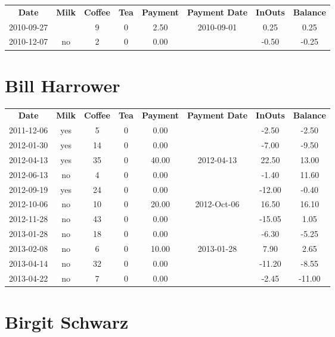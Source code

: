 \begin{center}
\begin{tabular}{cccccccc}
\textbf{Date} & \textbf{Milk} & \textbf{Coffee} & \textbf{Tea} & \textbf{Payment} & \textbf{Payment Date} & \textbf{InOuts} & \textbf{Balance} \\
2010-09-27 &  & 9 & 0 & 2.50 & 2010-09-01 &  0.25 &  0.25\\ 
2010-12-07 & no & 2 & 0 & 0.00 &  & -0.50 & -0.25
\end{tabular}
\end{center}

\section{Bill Harrower}

\begin{center}
\begin{tabular}{cccccccc}
\textbf{Date} & \textbf{Milk} & \textbf{Coffee} & \textbf{Tea} & \textbf{Payment} & \textbf{Payment Date} & \textbf{InOuts} & \textbf{Balance} \\
2011-12-06 & yes &  5 & 0 &  0.00 &  &  -2.50 &  -2.50\\ 
2012-01-30 & yes & 14 & 0 &  0.00 &  &  -7.00 &  -9.50\\ 
2012-04-13 & yes & 35 & 0 & 40.00 & 2012-04-13 &  22.50 &  13.00\\ 
2012-06-13 & no &  4 & 0 &  0.00 &  &  -1.40 &  11.60\\ 
2012-09-19 & yes & 24 & 0 &  0.00 &  & -12.00 &  -0.40\\ 
2012-10-06 & no & 10 & 0 & 20.00 & 2012-Oct-06 &  16.50 &  16.10\\ 
2012-11-28 & no & 43 & 0 &  0.00 &  & -15.05 &   1.05\\ 
2013-01-28 & no & 18 & 0 &  0.00 &  &  -6.30 &  -5.25\\ 
2013-02-08 & no &  6 & 0 & 10.00 & 2013-01-28 &   7.90 &   2.65\\ 
2013-04-14 & no & 32 & 0 &  0.00 &  & -11.20 &  -8.55\\ 
2013-04-22 & no &  7 & 0 &  0.00 &  &  -2.45 & -11.00
\end{tabular}
\end{center}

\section{Birgit Schwarz}

